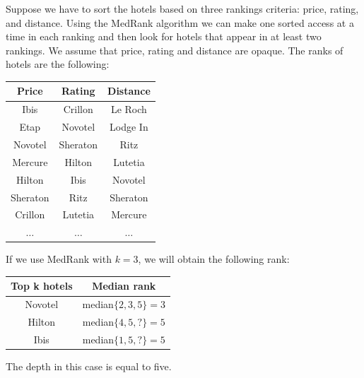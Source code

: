\documentclass[12pt, a4paper]{report}
\newtheorem[style=M,bodystyle=\normalfont]{theorem}{Theorem}
\newtheorem[style=M,bodystyle=\normalfont]{corollary}{Corollary}
\newtheorem[style=M,bodystyle=\normalfont]{lemma}{Lemma}
\newtheorem[style=M,bodystyle=\normalfont]{definition}{Definition}
\begin{document}
    \begin{example}
        Suppose we have to sort the hotels based on three rankings criteria: price, rating, and distance. Using the MedRank algorithm we can make one sorted access at a time in 
        each ranking and then look for hotels that appear in at least two rankings. We assume that price, rating and distance are opaque. The 
        ranks of hotels are the following:
        \begin{table}[H]
            \centering
            \begin{tabular}{c|c|c}
            \textbf{Price} & \textbf{Rating} & \textbf{Distance} \\ \hline
            Ibis           & Crillon         & Le Roch           \\
            Etap           & Novotel         & Lodge In          \\
            Novotel        & Sheraton        & Ritz              \\
            Mercure        & Hilton          & Lutetia           \\
            Hilton         & Ibis            & Novotel           \\
            Sheraton       & Ritz            & Sheraton          \\
            Crillon        & Lutetia         & Mercure           \\
            $\dots$        & $\dots$         & $\dots$          
            \end{tabular}
        \end{table}
        If we use MedRank with $k=3$, we will obtain the following rank: 
        \begin{table}[H]
            \centering
            \begin{tabular}{cc}
            \hline
            \textbf{Top k hotels}       & \textbf{Median rank}          \\ \hline
            Novotel                     & median$\{2,3,5\}=3$           \\ 
            Hilton                      & median$\{4,5,?\}=5$           \\ 
            Ibis                        & median$\{1,5,?\}=5$           \\ \hline
            \end{tabular}
        \end{table}
        The depth in this case is equal to five. 
    \end{example}
\end{document}

